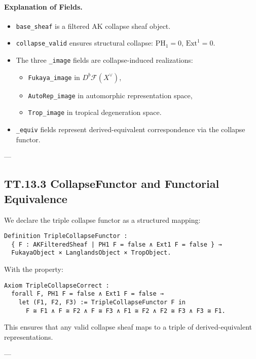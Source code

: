 \documentclass[11pt]{article}
\begin{document}
\paragraph{Explanation of Fields.}
\begin{itemize}
  \item \texttt{base\_sheaf} is a filtered AK collapse sheaf object.
  \item \texttt{collapse\_valid} ensures structural collapse: \( \mathrm{PH}_1 = 0 \), \( \mathrm{Ext}^1 = 0 \).
  \item The three \texttt{\_image} fields are collapse-induced realizations:
    \begin{itemize}
      \item \texttt{Fukaya\_image} in \( D^b\mathcal{F}(X^\vee) \),
      \item \texttt{AutoRep\_image} in automorphic representation space,
      \item \texttt{Trop\_image} in tropical degeneration space.
    \end{itemize}
  \item \texttt{\_equiv} fields represent derived-equivalent correspondence via the collapse functor.
\end{itemize}

---

\subsection*{TT.13.3 CollapseFunctor and Functorial Equivalence}

We declare the triple collapse functor as a structured mapping:

\begin{verbatim}
Definition TripleCollapseFunctor :
  { F : AKFilteredSheaf | PH1 F = false ∧ Ext1 F = false } →
  FukayaObject × LanglandsObject × TropObject.
\end{verbatim}

With the property:

\begin{verbatim}
Axiom TripleCollapseCorrect :
  forall F, PH1 F = false ∧ Ext1 F = false →
    let (F1, F2, F3) := TripleCollapseFunctor F in
      F ≅ F1 ∧ F ≅ F2 ∧ F ≅ F3 ∧ F1 ≅ F2 ∧ F2 ≅ F3 ∧ F3 ≅ F1.
\end{verbatim}

This ensures that any valid collapse sheaf maps to a triple of derived-equivalent representations.

---
\end{document}
